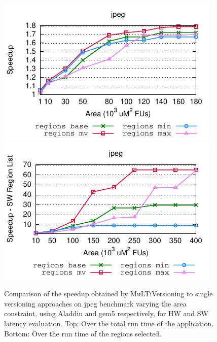 \documentclass[]{usiinfthesis}
\newcommand{\multi}{MuLTiVersioning}
\begin{document}
\begin{figure}[h]
\centering
\hspace*{-1cm}
\includegraphics[width= 0.6 \linewidth]{figs/plot_O3CPU}
\hspace*{-1cm}
\includegraphics[width= 0.6 \linewidth]{figs/plot_O3CPU_SW_large}
\caption{Comparison of the speedup obtained by MuLTiVersioning to single 
versioning approaches on jpeg benchmark
varying the area constraint, using Aladdin and gem5 respectively, for HW and 
SW latency evaluation.
Top: Over the
total run time of the application. Bottom: Over the run time of the regions 
selected.  
}
\label{fig:mlv_aladdin}
\end{figure}

\end{document}
